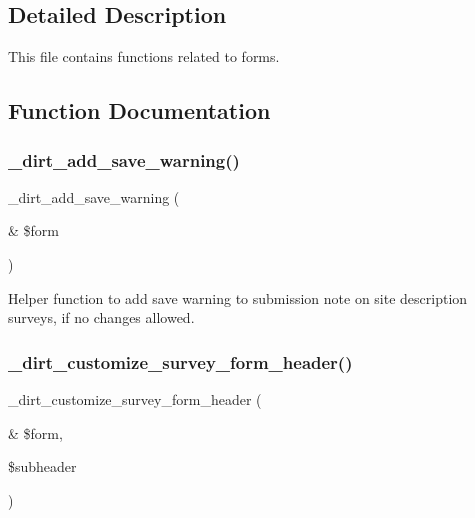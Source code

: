 \subsection{Detailed Description}
This file contains functions related to forms. 

\subsection{Function Documentation}
\mbox{\label{dirt_8forms_8inc_a06268ac490f210db3ed8f52583c5f43e}} 
\subsubsection{\texorpdfstring{\+\_\+dirt\+\_\+add\+\_\+save\+\_\+warning()}{\_dirt\_add\_save\_warning()}}
{\footnotesize\ttfamily \+\_\+dirt\+\_\+add\+\_\+save\+\_\+warning (\begin{DoxyParamCaption}\item[{\&}]{\$form }\end{DoxyParamCaption})}

Helper function to add save warning to submission note on site description surveys, if no changes allowed. \mbox{\label{dirt_8forms_8inc_a1b42c0a4e690a25820c250b5019d0af7}} 
\subsubsection{\texorpdfstring{\+\_\+dirt\+\_\+customize\+\_\+survey\+\_\+form\+\_\+header()}{\_dirt\_customize\_survey\_form\_header()}}
{\footnotesize\ttfamily \+\_\+dirt\+\_\+customize\+\_\+survey\+\_\+form\+\_\+header (\begin{DoxyParamCaption}\item[{\&}]{\$form,  }\item[{}]{\$subheader }\end{DoxyParamCaption})}

